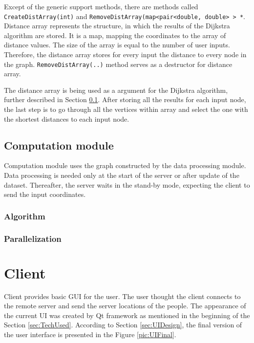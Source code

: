 \documentclass[thesis=M,english]{FITthesis}[2012/10/20]
\begin{document}
Except of the generic support methods, there are methods called \texttt{CreateDistArray(int)} and \texttt{RemoveDistArray(map<pair<double, double> > *}. Distance array represents the structure, in which the results of the Dijkstra algorithm are stored. It is a map, mapping the coordinates to the array of distance values. The size of the array is equal to the number of user inputs. Therefore, the distance array stores for every input the distance to every node in the graph. 
\texttt{RemoveDistArray(..)} method serves as a destructor for distance array.

The distance array is being used as a argument for the Dijkstra algorithm, further described in Section \ref{subsec:server_comp}. After storing all the results for each input node, the last step is to go through all the vertices within array and select the one with the shortest distances to each input node.


\subsection{Computation module}
\label{subsec:server_comp}
Computation module uses the graph constructed by the data processing module. Data processing is needed only at the start of the server or after update of the dataset. Thereafter, the server waits in the stand-by mode, expecting the client to send the input coordinates. 

\subsubsection{Algorithm}

\subsubsection{Parallelization}

\section{Client}
\label{sec:RClient}
Client provides basic GUI for the user. The user thought the client connects to the remote server and send the server locations of the people.
The appearance of the current UI was created by Qt framework as mentioned in the beginning of the Section \ref{sec:TechUsed}. According to Section \ref{sec:UIDesign}, the final version of the user interface is presented in the Figure \ref{pic:UIFinal}.
\end{document}
